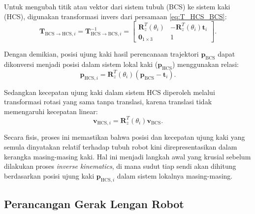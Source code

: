 Untuk mengubah titik atau vektor dari sistem tubuh (BCS) ke sistem kaki (HCS),
digunakan transformasi invers dari persamaan \eqref{eq:T_HCS_BCS}:
\begin{equation}
\mathbf{T}_{\text{BCS}\rightarrow\text{HCS}, i} 
= 
\mathbf{T}_{\text{HCS}\rightarrow\text{BCS}, i}^{-1}
=
\begin{bmatrix}
\mathbf{R}_{z}^{T}(\theta_i) & -\mathbf{R}_{z}^{T}(\theta_i)\mathbf{t}_i \\
\mathbf{0}_{1\times3} & 1
\end{bmatrix}.
\label{eq:T_BCS_HCS}
\end{equation}

Dengan demikian, posisi ujung kaki hasil perencanaan trajektori
\(\mathbf{p}_{\text{BCS}}\) dapat dikonversi menjadi posisi dalam sistem lokal
kaki (\(\mathbf{p}_{\text{HCS}}\)) menggunakan relasi:
\begin{equation}
\mathbf{p}_{\text{HCS}, i} 
= 
\mathbf{R}_{z}^{T}(\theta_i)\left(\mathbf{p}_{\text{BCS}} - \mathbf{t}_i\right).
\label{eq:position_conversion}
\end{equation}

Sedangkan kecepatan ujung kaki dalam sistem HCS diperoleh melalui transformasi
rotasi yang sama tanpa translasi, karena translasi tidak memengaruhi kecepatan
linear:
\begin{equation} \mathbf{v}_{\text{HCS}, i} =
\mathbf{R}_{z}^{T}(\theta_i)\mathbf{v}_{\text{BCS}}. \label{eq:
velocity_conversion} \end{equation}

Secara fisis, proses ini memastikan bahwa posisi dan kecepatan ujung kaki yang
semula dinyatakan relatif terhadap tubuh robot kini direpresentasikan dalam
kerangka masing-masing kaki. Hal ini menjadi langkah awal yang krusial sebelum
dilakukan proses \textit{inverse kinematics}, di mana sudut tiap sendi akan
dihitung berdasarkan posisi ujung kaki \(\mathbf{p}_{\text{HCS}, i}\) dalam
sistem lokalnya masing-masing.

\subsection{Perancangan Gerak Lengan Robot}

